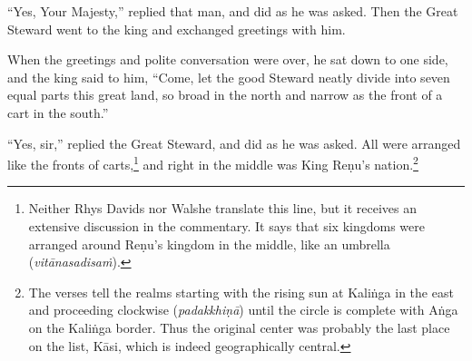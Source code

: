 \documentclass[12pt,openany]{book}%
\begin{document}
“Yes, Your Majesty,” replied that man, and did as he was asked. Then the Great Steward went to the king and exchanged greetings with him. 

When the greetings and polite conversation were over, he sat down to one side, and the king said to him, “Come, let the good Steward neatly divide into seven equal parts this great land, so broad in the north and narrow as the front of a cart in the south.” 

“Yes, sir,” replied the Great Steward, and did as he was asked. All were arranged like the fronts of carts,\footnote{Neither Rhys Davids nor Walshe translate this line, but it receives an extensive discussion in the commentary. It says that six kingdoms were arranged around \textsanskrit{Reṇu}’s kingdom in the middle, like an umbrella (\textit{\textsanskrit{vitānasadisaṁ}}). } and right in the middle was King \textsanskrit{Reṇu}’s nation.\footnote{The verses tell the realms starting with the rising sun at \textsanskrit{Kaliṅga} in the east and proceeding clockwise (\textit{\textsanskrit{padakkhiṇā}}) until the circle is complete with \textsanskrit{Aṅga} on the \textsanskrit{Kaliṅga} border. Thus the original center was probably the last place on the list, \textsanskrit{Kāsi}, which is indeed geographically central. } 
\end{document}
